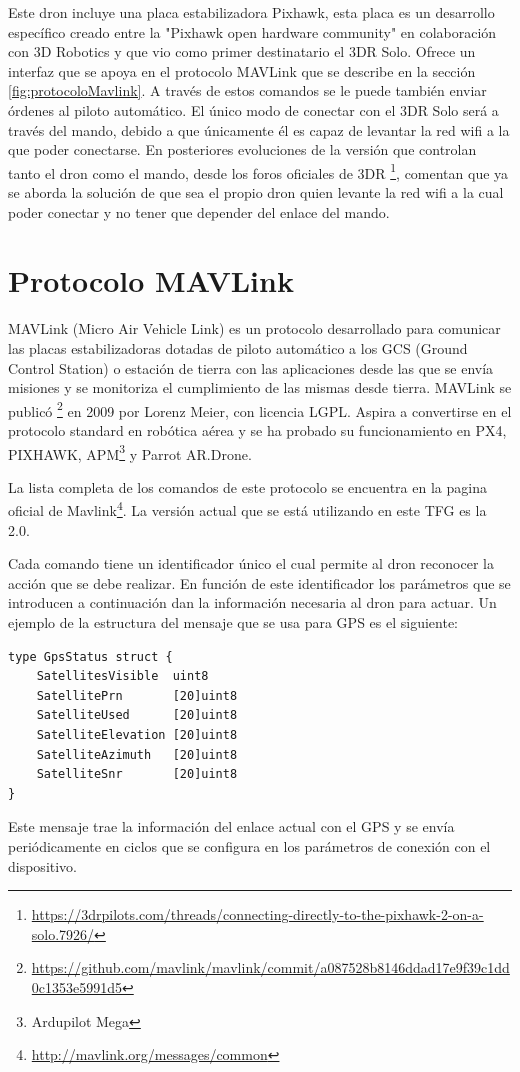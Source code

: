 Este dron incluye una placa estabilizadora Pixhawk, esta placa es un desarrollo específico creado entre la "Pixhawk\cite{pixhawk} open hardware community" en colaboración con 3D Robotics y que vio como primer destinatario el 3DR Solo. Ofrece un interfaz que se apoya en el protocolo MAVLink que se describe en la sección \ref{fig:protocoloMavlink}. A través de estos comandos se le puede también enviar órdenes al piloto automático. El único modo de conectar con el 3DR Solo será a través del mando, debido a que únicamente él es capaz de levantar la red wifi a la que poder conectarse. En posteriores evoluciones de la versión que controlan tanto el dron como el mando, desde los foros oficiales de 3DR \footnote{\url{https://3drpilots.com/threads/connecting-directly-to-the-pixhawk-2-on-a-solo.7926/}}, comentan que ya se aborda la solución de que sea el propio dron quien levante la red wifi a la cual poder conectar y no tener que depender del enlace del mando.

\section{Protocolo MAVLink}
\label{sec:mavlink}

MAVLink\cite{mavlink} (Micro Air Vehicle Link) es un protocolo desarrollado para comunicar las placas estabilizadoras dotadas de piloto automático a los GCS (Ground Control Station) o estación de tierra con las aplicaciones desde las que se envía misiones y se monitoriza el cumplimiento de las mismas desde tierra.
MAVLink se publicó \footnote{\url{https://github.com/mavlink/mavlink/commit/a087528b8146ddad17e9f39c1dd0c1353e5991d5}} en 2009 por Lorenz Meier, con licencia LGPL. Aspira a convertirse en el protocolo standard en robótica aérea y se ha probado su funcionamiento en PX4, PIXHAWK, APM\footnote{Ardupilot Mega} y Parrot AR.Drone.

La lista completa de los comandos de este protocolo se encuentra en la pagina oficial de Mavlink\footnote{\url{http://mavlink.org/messages/common}}. La versión actual que se está utilizando en este TFG es la 2.0. 

Cada comando tiene un identificador único  el cual permite al dron reconocer la acción que se debe realizar. En función de este identificador los parámetros que se introducen a continuación dan la información necesaria al dron para actuar. Un ejemplo de la estructura del mensaje que se usa para GPS es el siguiente:
\begin{lstlisting}[frame=single]
type GpsStatus struct {
    SatellitesVisible  uint8      
    SatellitePrn       [20]uint8  
    SatelliteUsed      [20]uint8  
    SatelliteElevation [20]uint8  
    SatelliteAzimuth   [20]uint8  
    SatelliteSnr       [20]uint8  
}
\end{lstlisting}
Este mensaje trae la información del enlace actual con el GPS y se envía periódicamente en ciclos que se configura en los parámetros de conexión con el dispositivo.

